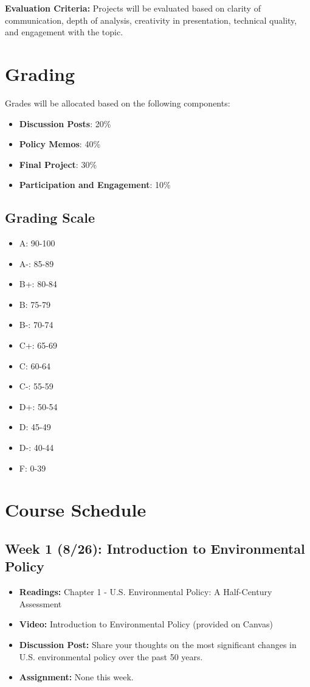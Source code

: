 \documentclass[12pt, letterpaper]{article}
\begin{document}
\textbf{Evaluation Criteria:} Projects will be evaluated based on clarity of communication, depth of analysis, creativity in presentation, technical quality, and engagement with the topic.

\section*{Grading}
Grades will be allocated based on the following components:
\begin{itemize}
    \item \textbf{Discussion Posts}: 20\%
    \item \textbf{Policy Memos}: 40\%
    \item \textbf{Final Project}: 30\%
    \item \textbf{Participation and Engagement}: 10\%
\end{itemize}

\subsection*{Grading Scale}

\begin{itemize}
    \item A: 90-100
    \item A-: 85-89
    \item B+: 80-84
    \item B: 75-79
    \item B-: 70-74
    \item C+: 65-69
    \item C: 60-64
    \item C-: 55-59
    \item D+: 50-54
    \item D: 45-49
    \item D-: 40-44
    \item F: 0-39
\end{itemize}


\section*{Course Schedule}
\subsection*{Week 1 (8/26): Introduction to Environmental Policy}
\begin{itemize}
    \item \textbf{Readings:} Chapter 1 - U.S. Environmental Policy: A Half-Century Assessment
    \item \textbf{Video:} Introduction to Environmental Policy (provided on Canvas)
    \item \textbf{Discussion Post:} Share your thoughts on the most significant changes in U.S. environmental policy over the past 50 years.
    \item \textbf{Assignment:} None this week.
\end{itemize}
\end{document}

